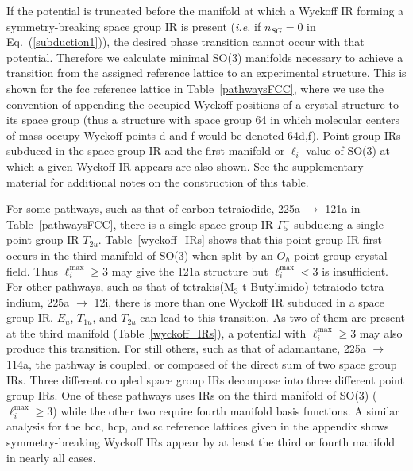 \documentclass[preprint]{iucr}              %
\begin{document}
If the potential is truncated before the manifold at which a Wyckoff
IR forming a symmetry-breaking space group IR is present
(\emph{i.e.} if $n_{SG}=0$ in Eq.~(\ref{subduction1})), the desired
phase transition cannot occur with that potential. Therefore we
calculate minimal SO(3) manifolds necessary to achieve a transition
from the assigned reference lattice to an experimental structure.
This is shown for the fcc reference lattice in Table~\ref{pathwaysFCC}, where we use the convention of appending the occupied Wyckoff positions of a crystal structure to its space group (thus a structure with space group 64 in which molecular centers of mass occupy Wyckoff points d and f would be denoted 64d,f). Point group IRs subduced in the space group IR and the first
manifold or $\ell_i$ value of SO(3) at which a given Wyckoff IR appears are also shown.  See the supplementary material for additional notes on the construction of this table.

For some pathways, such as that of carbon tetraiodide, 225a
$\rightarrow$ 121a in Table~\ref{pathwaysFCC}, there is a single
space group IR $\Gamma_5^-$ subducing a single point group IR
$T_{2u}$. Table~\ref{wyckoff_IRs} shows that this point group IR
first occurs in the third manifold of SO(3) when split by an $O_h$
point group crystal field.  Thus $\ell_i^{\mathrm{max}}\geq 3$ may
give the 121a structure but $\ell_i^{\mathrm{max}} < 3$ is insufficient. For other pathways, such as that of tetrakis(M$_3$-t-Butylimido)-tetraiodo-tetra-indium, 225a
$\rightarrow$ 12i, there is more than
one Wyckoff IR subduced in a space group IR. $E_u$, $T_{1u}$, and
$T_{2u}$ can lead to this transition. As two of them are present at the
third manifold (Table~\ref{wyckoff_IRs}), a potential with $\ell_i^{\mathrm{max}}\geq 3$ may also produce this transition. For still others, such as that of adamantane,
225a $\rightarrow$ 114a, the pathway is
coupled, or composed of the direct sum of two space group IRs.
Three different coupled space group IRs decompose into three
different point group IRs. One of these pathways uses IRs on the
third manifold of SO(3) ($\ell^{\mathrm{max}}_i\geq 3$) while the
other two require fourth manifold basis functions. A similar analysis
for the bcc, hcp, and sc reference
lattices given in the appendix shows symmetry-breaking
Wyckoff IRs appear by at least the third or fourth manifold in
nearly all cases.
\end{document}
